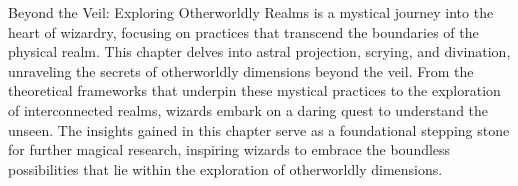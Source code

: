 Beyond the Veil: Exploring Otherworldly Realms is a mystical journey into the heart of wizardry, focusing on practices that transcend the boundaries of the physical realm. This chapter delves into astral projection, scrying, and divination, unraveling the secrets of otherworldly dimensions beyond the veil. From the theoretical frameworks that underpin these mystical practices to the exploration of interconnected realms, wizards embark on a daring quest to understand the unseen. The insights gained in this chapter serve as a foundational stepping stone for further magical research, inspiring wizards to embrace the boundless possibilities that lie within the exploration of otherworldly dimensions.
